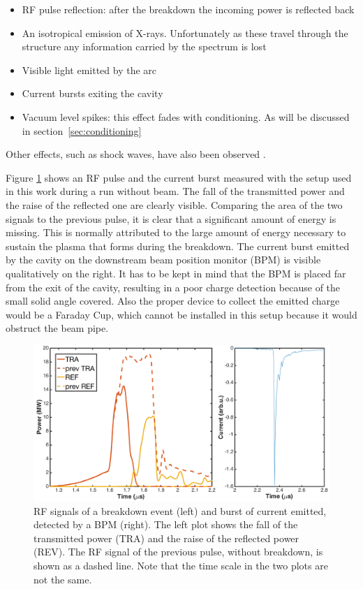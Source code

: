 \begin{itemize}
\item RF pulse reflection: after the breakdown the incoming power is reflected back
\item An isotropical emission of X-rays. Unfortunately as these travel through the structure any information carried by the spectrum is lost
\item Visible light emitted by the arc
\item Current bursts exiting the cavity
\item Vacuum level spikes: this effect fades with conditioning. As will be discussed in section~\ref{sec:conditioning} 
\end{itemize}
Other effects, such as shock waves, have also been observed \cite{Rajamaki:2143815}. 

Figure \ref{RFandBPM} shows an RF pulse and the current burst measured with the setup used in this work during a run without beam. The fall of the transmitted power and the raise of the reflected one are clearly visible. Comparing the area of the two signals to the previous pulse, it is clear that a significant amount of energy is missing. This is normally attributed to the large amount of energy necessary to sustain the plasma that forms during the breakdown. The current burst emitted by the cavity on the downstream beam position monitor (BPM) is visible qualitatively on the right. It has to be kept in mind that the BPM is placed far from the exit of the cavity, resulting in a poor charge detection because of the small solid angle covered. Also the proper device to collect the emitted charge would be a Faraday Cup, which cannot be installed in this setup because it would obstruct the beam pipe. 


\begin{figure}[h]
\centering
\includegraphics[scale=0.33]{pictures/RFandBPM.png}
\caption{RF signals of a breakdown event (left) and burst of current emitted, detected by a BPM (right). The left plot shows the fall of the transmitted power (TRA) and the raise of the reflected power (REV). The RF signal of the previous pulse, without breakdown, is shown as a dashed line. Note that the time scale in the two plots are not the same.}
\label{RFandBPM}
\end{figure}




